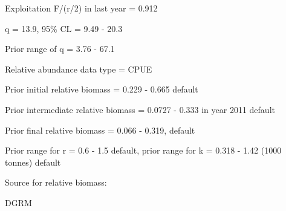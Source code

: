 \documentclass[12pt,a4paper]{article}\usepackage[]{graphicx}\usepackage[]{xcolor}
\begin{document}
Exploitation F/(r/2) in last year = 0.912

q = 13.9, 95\% CL = 9.49 - 20.3

Prior range of q = 3.76 - 67.1

Relative abundance data type = CPUE

Prior initial relative biomass = 0.229 - 0.665 default

Prior intermediate relative biomass = 0.0727 - 0.333 in year 2011 default

Prior final relative biomass = 0.066 - 0.319, default

Prior range for r = 0.6 - 1.5 default, prior range for k = 0.318 - 1.42 (1000 tonnes) default

Source for relative biomass: 

DGRM

    
\end{document}
